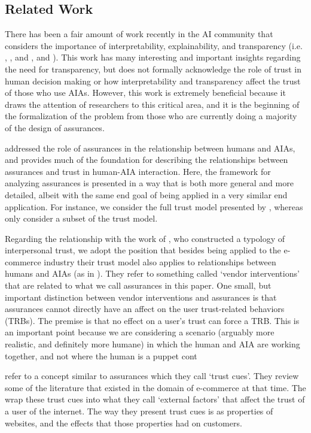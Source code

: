 \subsection{Related Work}\label{sec:rel_work}
    There has been a fair amount of work recently in the AI community that considers the importance of interpretability, explainability, and transparency (i.e. \citet{Doshi-Velez2017-xy}, \citet{Weller2017-zx}, and \citet{Lipton2016-ug}, and \citet{Gunning2017-ih}). This work has many interesting and important insights regarding the need for transparency, but does not formally acknowledge the role of trust in human decision making or how interpretability and transparency affect the trust of those who use AIAs. However, this work is extremely beneficial because it draws the attention of researchers to this critical area, and it is the beginning of the formalization of the problem from those who are currently doing a majority of the design of assurances.

    \citet{Lillard2016-yg} addressed the role of assurances in the relationship between humans and AIAs, and provides much of the foundation for describing the relationships between assurances and trust in human-AIA interaction. Here, the framework for analyzing assurances is presented in a way that is both more general and more detailed, albeit with the same end goal of being applied in a very similar end application. For instance, we consider the full trust model presented by \citet{McKnight2001-fa}, whereas \citeauthor{Lillard2016-yg} only consider a subset of the trust model.

    Regarding the relationship with the work of \citet{McKnight2001-fa}, who constructed a typology of interpersonal trust, we adopt the position that besides being applied to the e-commerce industry their trust model also applies to relationships between humans and AIAs (as in \citet{Lillard2016-yg}). They refer to something called `vendor interventions' that are related to what we call assurances in this paper. One small, but important distinction between vendor interventions and assurances is that assurances cannot directly have an affect on the user trust-related behaviors (TRBs). The premise is that no effect on a user's trust can force a TRB. This is an important point because we are considering a scenario (arguably more realistic, and definitely more humane) in which the human and AIA are working together, and not where the human is a puppet cont

    \citet{Corritore2003-gx} refer to a concept similar to assurances which they call `trust cues'. They review some of the literature that existed in the domain of e-commerce at that time. The wrap these trust cues into what they call `external factors' that affect the trust of a user of the internet. The way they present trust cues is as properties of websites, and the effects that those properties had on customers.
    
